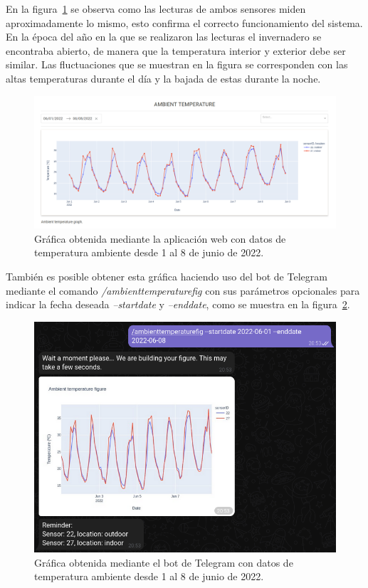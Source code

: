 \documentclass[a4paper, 12pt, oneside]{book}
\begin{document}
En la figura~\ref{figura:ambient_temperature_01_08_junio} se observa como las lecturas de ambos sensores miden aproximadamente lo mismo, esto confirma el correcto funcionamiento del sistema. En la época del año en la que se realizaron las lecturas el invernadero se encontraba abierto, de manera que la temperatura interior y exterior debe ser similar. Las fluctuaciones que se muestran en la figura se corresponden con las altas temperaturas durante el día y la bajada de estas durante la noche.

\begin{figure}[H]
	\centering
    \includegraphics[width=12cm, keepaspectratio]{img/ambient_temperature_01_08_junio}
    \caption{Gráfica obtenida mediante la aplicación web con datos de temperatura ambiente desde 1 al 8 de junio de 2022.}
    \label{figura:ambient_temperature_01_08_junio}
\end{figure}

También es posible obtener esta gráfica haciendo uso del bot de Telegram mediante el comando \textit{/ambienttemperaturefig} con sus parámetros opcionales para indicar la fecha deseada \textit{--startdate} y \textit{--enddate}, como se muestra en la figura~\ref{figura:telegram_ambient_temperature_01_08_junio}.
\begin{figure}[H]
	\centering
    \includegraphics[width=12cm, keepaspectratio]{img/telegram_ambient_temperature_01_08_junio}
    \caption{Gráfica obtenida mediante el bot de Telegram con datos de temperatura ambiente desde 1 al 8 de junio de 2022.}
    \label{figura:telegram_ambient_temperature_01_08_junio}
\end{figure}
\end{document}
